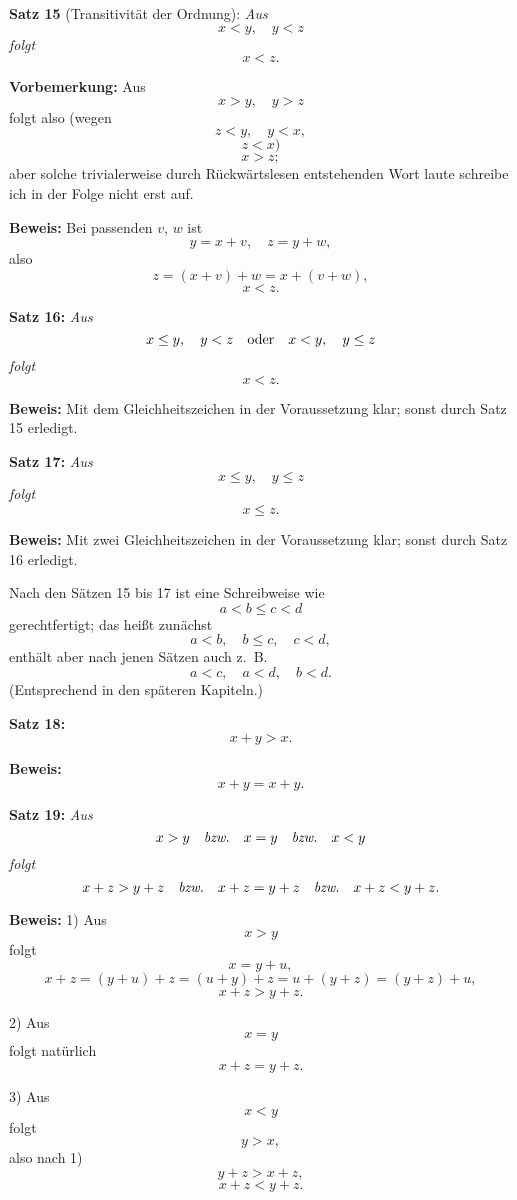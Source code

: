
{\bf Satz 15} (Transitivit\"at der Ordnung): {\it Aus
$$x < y,\quad y < z$$
folgt
$$x < z.$$}%

{\bf Vorbemerkung:} Aus
$$x > y,\quad y > z$$
folgt also (wegen
$$z < y,\quad y < x,$$
$$z < x)$$
$$x > z;$$
aber solche trivialerweise durch R\"uckw\"artslesen entstehenden Wort%
laute schreibe ich in der Folge nicht erst auf.

{\bf Beweis:} Bei passenden $v$, $w$ ist
$$y = x + v,\quad z = y + w,$$
also
$$z = (x + v) + w = x + (v + w),$$
$$x < z.$$
\medskip


{\bf Satz 16:} {\it Aus
$$x \le y,\quad y < z\quad\hbox{oder}\quad x < y,\quad y \le z$$
folgt
$$x < z.$$}%

{\bf Beweis:} Mit dem Gleichheitszeichen in der Voraussetzung klar;
sonst durch Satz 15 erledigt.
\medskip


{\bf Satz 17:} {\it Aus
$$x \le y,\quad y \le z$$
folgt
$$x \le z.$$}%

{\bf Beweis:} Mit zwei Gleichheitszeichen in der Voraussetzung
klar; sonst durch Satz 16 erledigt.

Nach den S\"atzen 15 bis 17 ist eine Schreibweise wie
$$a < b \le c < d$$
gerechtfertigt; das hei{\ss}t zun\"achst
$$a < b,\quad b \le c,\quad c < d,$$
enth\"alt aber nach jenen S\"atzen auch z.~B.\ %
$$a < c,\quad a < d,\quad b < d.$$
(Entsprechend in den sp\"ateren Kapiteln.)
\medskip


{\bf Satz 18:} {\it $$x + y > x.$$}%

{\bf Beweis:} $$x + y = x + y.$$
\medskip


{\bf Satz 19:} {\it Aus
$$x > y\quad\hbox{\it bzw.}\quad x = y\quad\hbox{\it bzw.}\quad x < y$$
folgt
$$x + z > y + z\quad\hbox{\it bzw.}\quad x + z = y + z\quad\hbox{\it bzw.}\quad x + z < y + z.$$}%

{\bf Beweis:} 1) Aus
$$x > y$$
folgt
$$x = y + u,$$
$$x + z = (y + u) + z = (u + y) + z = u + (y + z) = (y + z) + u,$$
$$x + z > y + z.$$

2) Aus
$$x = y$$
folgt nat\"urlich
$$x + z = y + z.$$

3) Aus
$$x < y$$
folgt
$$y > x,$$
also nach 1)
$$y + z > x + z,$$
$$x + z < y + z.$$
\medskip


